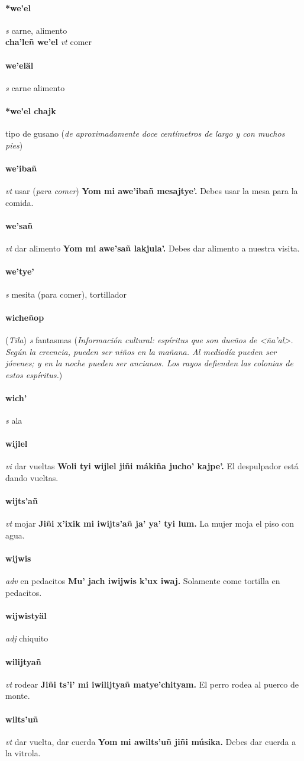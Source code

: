 \documentclass{scrbook}
\newcommand{\entry}[1]{\paragraph{#1}}
\newcommand{\partofspeech}[1]{\textit{#1}}
\newcommand{\spanishtranslation}[1]{#1}
\newcommand{\clarification}[1]{(\textit{#1})}
\newcommand{\cholexample}[1]{\textbf{#1}}
\newcommand{\exampletranslation}[1]{#1}
\newcommand{\relevantdialect}[1]{(\textit{#1})}
\newcommand{\culturalinformation}[1]{(\textit{#1})}
\newcommand{\secondaryentry}[1]{\\\textbf{#1}}
\newcommand{\secondpartofspeech}[1]{\textit{#1}}
\newcommand{\secondtranslation}[1]{#1}
\begin{document}
\begin{multicols}{2}
\entry{*we'el}
\partofspeech{s}
\spanishtranslation{carne, alimento}
\secondaryentry{cha'leñ we'el}
\secondpartofspeech{vt}
\secondtranslation{comer}

\entry{we'eläl}
\partofspeech{s}
\spanishtranslation{carne}
\spanishtranslation{alimento}

\entry{*we'el chajk}
\spanishtranslation{tipo de gusano}
\clarification{de aproximadamente doce centímetros de largo y con muchos pies}

\entry{we'ibañ}
\partofspeech{vt}
\spanishtranslation{usar}
\clarification{para comer}
\cholexample{Yom mi awe'ibañ mesajtye'.}
\exampletranslation{Debes usar la mesa para la comida.}

\entry{we'sañ}
\partofspeech{vt}
\spanishtranslation{dar alimento}
\cholexample{Yom mi awe'sañ lakjula'.}
\exampletranslation{Debes dar alimento a nuestra visita.}

\entry{we'tye'}
\partofspeech{s}
\spanishtranslation{mesita (para comer), tortillador}

\entry{wicheñop}
\relevantdialect{Tila}
\partofspeech{s}
\spanishtranslation{fantasmas}
\culturalinformation{Información cultural: espíritus que son dueños de <ña'al>. Según la creencia, pueden ser niños en la mañana. Al mediodía pueden ser jóvenes; y en la noche pueden ser ancianos. Los rayos defienden las colonias de estos espíritus.}

\entry{wich'}
\partofspeech{s}
\spanishtranslation{ala}

\entry{wijlel}
\partofspeech{vi}
\spanishtranslation{dar vueltas}
\cholexample{Woli tyi wijlel jiñi mákiña jucho' kajpe'.}
\exampletranslation{El despulpador está dando vueltas.}

\entry{wijts'añ}
\partofspeech{vt}
\spanishtranslation{mojar}
\cholexample{Jiñi x'ixik mi iwijts'añ ja' ya' tyi lum.}
\exampletranslation{La mujer moja el piso con agua.}

\entry{wijwis}
\partofspeech{adv}
\spanishtranslation{en pedacitos}
\cholexample{Mu' jach iwijwis k'ux iwaj.}
\exampletranslation{Solamente come tortilla en pedacitos.}

\entry{wijwistyäl}
\partofspeech{adj}
\spanishtranslation{chiquito}

\entry{wilijtyañ}
\partofspeech{vt}
\spanishtranslation{rodear}
\cholexample{Jiñi ts'i' mi iwilijtyañ matye'chityam.}
\exampletranslation{El perro rodea al puerco de monte.}

\entry{wilts'uñ}
\partofspeech{vt}
\spanishtranslation{dar vuelta, dar cuerda}
\cholexample{Yom mi awilts'uñ jiñi músika.}
\exampletranslation{Debes dar cuerda a la vitrola.}


\end{multicols}
\end{document}
